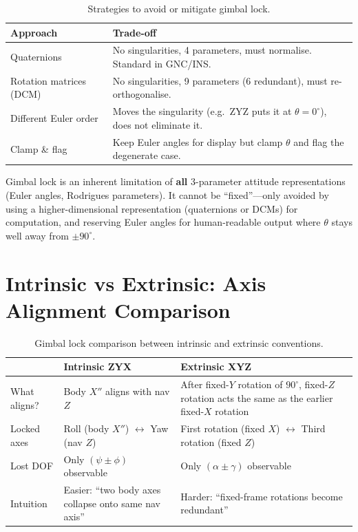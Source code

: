 \documentclass[12pt,a4paper]{article}
\begin{document}
\begin{table}[h]
\centering
\begin{tabular}{@{}p{4cm}p{9cm}@{}}
\toprule
\textbf{Approach} & \textbf{Trade-off} \\
\midrule
Quaternions & No singularities, 4 parameters, must normalise.
  Standard in GNC/INS. \\
Rotation matrices (DCM) & No singularities, 9 parameters (6 redundant),
  must re-orthogonalise. \\
Different Euler order & Moves the singularity (e.g.\ ZYZ puts it at
  $\theta = 0^\circ$), does not eliminate it. \\
Clamp \& flag & Keep Euler angles for display but clamp $\theta$
  and flag the degenerate case. \\
\bottomrule
\end{tabular}
\caption{Strategies to avoid or mitigate gimbal lock.}
\end{table}

\begin{keybox}
Gimbal lock is an inherent limitation of \textbf{all} 3-parameter attitude
representations (Euler angles, Rodrigues parameters). It cannot be
``fixed''---only avoided by using a higher-dimensional representation
(quaternions or DCMs) for computation, and reserving Euler angles for
human-readable output where $\theta$ stays well away from $\pm 90^\circ$.
\end{keybox}

\section{Intrinsic vs Extrinsic: Axis Alignment Comparison}

\begin{table}[h]
\centering
\begin{tabular}{@{}p{3.5cm}p{5.5cm}p{5.5cm}@{}}
\toprule
 & \textbf{Intrinsic ZYX} & \textbf{Extrinsic XYZ} \\
\midrule
What aligns? & Body $X''$ aligns with nav $Z$ &
  After fixed-$Y$ rotation of $90^\circ$, fixed-$Z$ rotation acts the same as
  the earlier fixed-$X$ rotation \\
Locked axes & Roll (body $X''$) $\leftrightarrow$ Yaw (nav $Z$) &
  First rotation (fixed $X$) $\leftrightarrow$ Third rotation (fixed $Z$) \\
Lost DOF & Only $(\psi \pm \phi)$ observable &
  Only $(\alpha \pm \gamma)$ observable \\
Intuition & Easier: ``two body axes collapse onto same nav axis'' &
  Harder: ``fixed-frame rotations become redundant'' \\
\bottomrule
\end{tabular}
\caption{Gimbal lock comparison between intrinsic and extrinsic conventions.}
\end{table}
\end{document}
